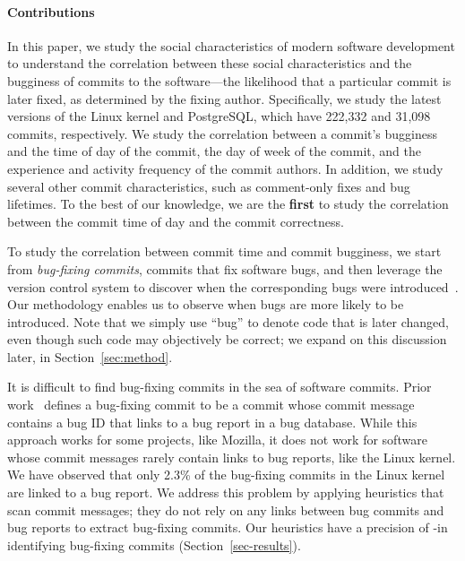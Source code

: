 
\paragraph{Contributions}

In this paper, we study the social characteristics of modern software
development to understand the correlation between these social characteristics
and the bugginess of commits to the software---the likelihood that a
particular commit is later fixed, as determined by the fixing author.
Specifically, we study the latest versions of the Linux kernel and PostgreSQL,
which have 222,332 and 31,098 commits, respectively. We study the correlation
between a commit's bugginess and the time of day of the commit, the day of week
of the commit, and the experience and activity frequency of the commit authors.
In addition, we study several other commit characteristics, such as comment-only
fixes and bug lifetimes.  To the best of our knowledge, we are the {\bf first}
to study the correlation between the commit time of day and the commit
correctness.

To study the correlation between commit time and commit bugginess, we start from
{\em bug-fixing commits}, commits that fix software bugs, and then leverage the
version control system to discover when the corresponding bugs were
introduced~\cite{sliwerski-msr-2005}.  Our methodology enables us to observe
when bugs are more likely to be introduced.  Note that we simply use ``bug'' to
denote code that is later changed, even though such code may objectively be
correct; we expand on this discussion later, in Section~\ref{sec:method}.

It is difficult to find bug-fixing commits in the sea of software commits.
Prior work~\cite{sliwerski-msr-2005} defines a bug-fixing commit to be a commit
whose commit message contains a bug ID that links to a bug report in a bug
database. While this approach works for some projects, like Mozilla, it does not
work for software whose commit messages rarely contain links to bug reports,
like the Linux kernel.  We have observed that only 2.3\% of the bug-fixing
commits in the Linux kernel are linked to a bug report. We address this problem
by applying heuristics that scan commit messages; they do not rely on any links
between bug commits and bug reports to extract bug-fixing commits.  Our
heuristics have a precision of \postP-\linuxP in identifying bug-fixing commits
(Section~\ref{sec-results}).

